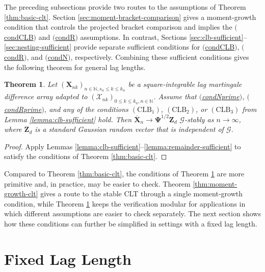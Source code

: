 \documentclass[11pt]{article}
\renewcommand\vec[1]{\boldsymbol{#1}}
\newcommand\mat[1]{\mathbf{#1}}
\newcommand{\N}{\mathbb{N}}
\newcommand{\G}{\mathcal{G}}
\newcommand{\X}{\mathcal{X}}
\newcommand{\refitem}[1]{$\mathrm{(}$\hyperlink{cond:#1}{\csname cond#1\endcsname}$\mathrm{)}$}
\newtheorem{theorem}{Theorem}
\theoremstyle{definition}
\begin{document}
The preceding subsections provide two routes to the assumptions of Theorem \ref{thm:basic-clt}.
Section \ref{sec:moment-bracket-comparison} gives a moment-growth condition that controls the projected bracket comparison and implies the \refitem{CLB} and \refitem{R} assumptions.
In contrast, Sections \ref{sec:clb-sufficient}--\ref{sec:nesting-sufficient} provide separate sufficient conditions for \refitem{CLB}, \refitem{R}, and \refitem{N}, respectively.
Combining these sufficient conditions gives the following theorem for general lag lengths.

\begin{theorem}\label{thm:sufficient-clt}
Let $(\vec{X}_{nk})_{n \in \N, s_n \leq k \leq k_n}$ be a square-integrable lag martingale difference array adapted to $(\X_{nk})_{0 \leq k \leq k_n, n \in \N}$.
Assume that \refitem{Nprime}, \refitem{Rprime}, and any of the conditions $(\mathrm{CLB}_1)$, $(\mathrm{CLB}_2)$, or $(\mathrm{CLB}_3)$ from Lemma \ref{lemma:clb-sufficient} hold.
Then $\overline{\vec{X}}_n \to \mat{\Psi}^{1/2} \vec{Z}_d$ $\G$-stably as $n \to \infty$, where $\vec{Z}_d$ is a standard Gaussian random vector that is independent of $\G$.
\end{theorem}

\begin{proof}
Apply Lemmas \ref{lemma:clb-sufficient}--\ref{lemma:remainder-sufficient} to satisfy the conditions of Theorem \ref{thm:basic-clt}.
\end{proof}

Compared to Theorem \ref{thm:basic-clt}, the conditions of Theorem \ref{thm:sufficient-clt} are more primitive and, in practice, may be easier to check.
Theorem \ref{thm:moment-growth-clt} gives a route to the stable CLT through a single moment-growth condition, while Theorem \ref{thm:sufficient-clt} keeps the verification modular for applications in which different assumptions are easier to check separately.
The next section shows how these conditions can further be simplified in settings with a fixed lag length.

\section{Fixed Lag Length}\label{sec:fixed-lag-length}
\end{document}
